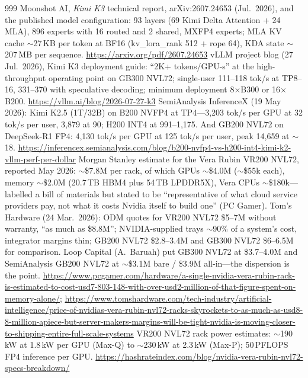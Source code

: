 \begin{thebibliography}{999}
 Moonshot AI, \emph{Kimi K3} technical report, arXiv:2607.24653 (Jul.\ 2026), and the published model configuration: 93 layers (69 Kimi Delta Attention + 24 MLA), 896 experts with 16 routed and 2 shared, MXFP4 experts; MLA KV cache $\sim$27\,KB per token at BF16 (kv\_lora\_rank 512 + rope 64), KDA state $\sim$207\,MB per sequence. \url{https://arxiv.org/pdf/2607.24653}
 vLLM project blog (27 Jul.\ 2026), Kimi K3 deployment guide: ``2K+ tokens/GPU-s'' at the high-throughput operating point on GB300 NVL72; single-user 111--118 tok/s at TP8--16, 331--370 with speculative decoding; minimum deployment 8$\times$B300 or 16$\times$B200. \url{https://vllm.ai/blog/2026-07-27-k3}
 SemiAnalysis InferenceX (19 May 2026): Kimi K2.5 (1T/32B) on B200 NVFP4 at TP4---3,203 tok/s per GPU at 32 tok/s per user, 3,879 at 90; H200 INT4 at 991--1,175. And GB200 NVL72 on DeepSeek-R1 FP4: 4,130 tok/s per GPU at 125 tok/s per user, peak 14,659 at $\sim$18. \url{https://inferencex.semianalysis.com/blog/b200-nvfp4-vs-h200-int4-kimi-k2-vllm-perf-per-dollar}
 Morgan Stanley estimate for the Vera Rubin VR200 NVL72, reported May 2026: $\sim$\$7.8M per rack, of which GPUs $\sim$\$4.0M ($\sim$\$55k each), memory $\sim$\$2.0M (20.7\,TB HBM4 plus 54\,TB LPDDR5X), Vera CPUs $\sim$\$180k---labelled a bill of materials but stated to be ``representative of what cloud service providers pay, not what it costs Nvidia itself to build one'' (PC Gamer). Tom's Hardware (24 Mar.\ 2026): ODM quotes for VR200 NVL72 \$5--7M without warranty, ``as much as \$8.8M''; NVIDIA-supplied trays $\sim$90\% of a system's cost, integrator margins thin; GB200 NVL72 \$2.8--3.4M and GB300 NVL72 \$6--6.5M for comparison. Loop Capital (A.~Baruah) put GB300 NVL72 at \$3.7--4.0M and SemiAnalysis GB200 NVL72 at $\sim$\$3.1M bare / \$3.9M all-in---the dispersion is the point. \url{https://www.pcgamer.com/hardware/a-single-nvidia-vera-rubin-rack-is-estimated-to-cost-usd7-803-148-with-over-usd2-million-of-that-figure-spent-on-memory-alone/}; \url{https://www.tomshardware.com/tech-industry/artificial-intelligence/price-of-nvidias-vera-rubin-nvl72-racks-skyrockets-to-as-much-as-usd8-8-million-apiece-but-server-makers-margins-will-be-tight-nvidia-is-moving-closer-to-shipping-entire-full-scale-systems}
 VR200 NVL72 rack power estimates: $\sim$190\,kW at 1.8\,kW per GPU (Max-Q) to $\sim$230\,kW at 2.3\,kW (Max-P); 50\,PFLOPS FP4 inference per GPU. \url{https://hashrateindex.com/blog/nvidia-vera-rubin-nvl72-specs-breakdown/}

\end{thebibliography}
